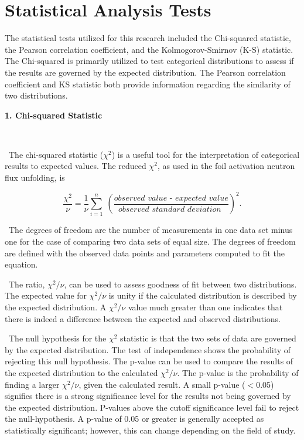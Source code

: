\section{Statistical Analysis Tests}

The statistical tests utilized for this research included the Chi-squared statistic, the Pearson correlation coefficient, and the Kolmogorov-Smirnov (K-S) statistic. 
The Chi-squared is primarily utilized to test categorical distributions to assess if the results are governed by the expected distribution. %
The Pearson correlation coefficient and KS statistic both provide information regarding the similarity of two distributions. 

\noindent \textbf{1. Chi-squared Statistic}

\

\ The chi-squared statistic ($\chi^{2}$) is a useful tool for the interpretation of categorical results to expected values. 
The reduced $\chi^{2}$, as used in the foil activation neutron flux unfolding, is \cite{Taylor}
	
\begin{equation} \label{eq:chi}
\dfrac{\chi^2}{\nu}= \dfrac{1}{\nu}\sum_{i=1}^{n} \; (\dfrac{\textit{observed value - expected value}}{\textit{observed standard deviation }})^2.
\end{equation}

\ The degrees of freedom are the number of measurements in one data set minus one for the case of comparing two data sets of equal size. 
The degrees of freedom are defined with the observed data points and parameters computed to fit the equation. 

\ The ratio, $\chi^{2}/\nu$, can be used to assess goodness of fit between two distributions. 
The expected value for $\chi^{2}/\nu$ is unity if the calculated distribution is described by the expected distribution. 
A $\chi^{2}/\nu$ value much greater than one indicates that there is indeed a difference between the expected and observed distributions. 

\ The null hypothesis for the $\chi^{2}$ statistic is that the two sets of data are governed by the expected distribution. The test of independence shows the probability of rejecting this null hypothesis. 
The p-value can be used to compare the results of the expected distribution to the calculated $\chi^{2}/\nu$. 
The p-value is the probability of finding a larger $\chi^{2}/\nu$, given the calculated result. A small p-value ($<$0.05) signifies there is a strong significance level for the results not being governed by the expected distribution. P-values above the cutoff significance level fail to reject the null-hypothesis. A p-value of 0.05 or greater is generally accepted as statistically significant; however, this can change depending on the field of study.

